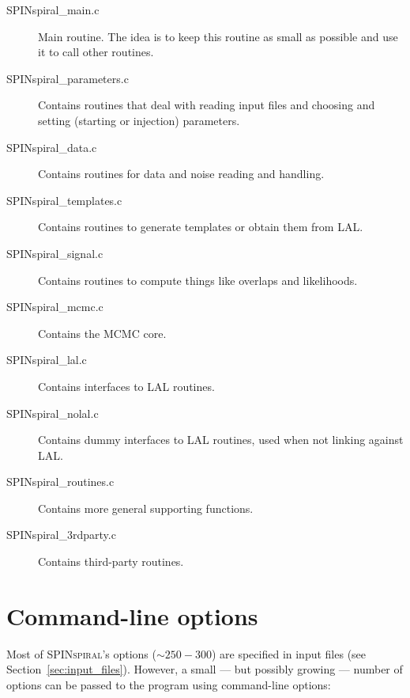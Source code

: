 \documentclass[10pt]{article}
\begin{document}
\begin{description}
\item[SPINspiral\_main.c] Main routine. The idea is to keep this routine as small as possible and use it to call other routines.
\item[SPINspiral\_parameters.c] Contains routines that deal with reading input files and choosing and setting (starting or injection) parameters.
\item[SPINspiral\_data.c] Contains routines for data and noise reading and handling.
\item[SPINspiral\_templates.c] Contains routines to generate templates or obtain them from LAL.
\item[SPINspiral\_signal.c] Contains routines to compute things like overlaps and likelihoods.
\item[SPINspiral\_mcmc.c] Contains the MCMC core.
\item[SPINspiral\_lal.c] Contains interfaces to LAL routines.
\item[SPINspiral\_nolal.c] Contains dummy interfaces to LAL routines, used when not linking against LAL.
\item[SPINspiral\_routines.c] Contains more general supporting functions.
\item[SPINspiral\_3rdparty.c] Contains third-party routines.
\end{description}





\pagebreak
\section{Command-line options}

Most of \textsc{SPINspiral}'s options ($\sim 250-300$) are specified in input files (see Section~\ref{sec:input_files}).
However, a small --- but possibly growing --- number of options can be passed to the program 
using command-line options:
\end{document}
